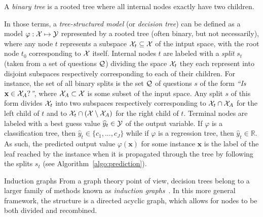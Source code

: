 \begin{definition}
A \emph{binary tree} is a rooted tree where all internal nodes exactly
have two children.
\end{definition}

In those terms, a \textit{tree-structured model} (or \textit{decision tree})
can be defined as a model $\varphi: {\cal X} \mapsto {\cal Y}$ represented by a
rooted tree (often binary, but not necessarily), where any node $t$ represents
a subspace ${\cal X}_t \subseteq {\cal X}$ of the intput space, with the root
node $t_0$ corresponding to ${\cal X}$ itself. Internal nodes $t$ are labeled with a
\textit{split} $s_t$ (taken from a set of questions ${\cal Q}$) dividing the
space ${\cal X}_t$ they each represent into disjoint subspaces respectively
corresponding to each of their children. For instance, the set of all binary
splits is the set ${\cal Q}$ of questions $s$ of the form \textit{``Is
$\mathbf{x} \in {\cal X}_A?$''}, where ${\cal X}_A \subset {\cal X}$ is some
subset of the input space. Any split $s$ of this form divides ${\cal X}_t$ into
two subspaces respectively corresponding to ${\cal X}_t \cap {\cal X}_A$ for
the left child of $t$ and to ${\cal X}_t \cap ({\cal X}\setminus{\cal X}_A)$
for the right child of $t$. Terminal nodes are labeled with a best guess value
$\widehat{y}_t \in {\cal Y}$ of the output variable. If $\varphi$ is a
classification tree, then $\widehat{y}_t \in \{ c_1, ..., c_J \}$ while if
$\varphi$ is a regression tree, then $\widehat{y}_t \in \mathbb{R}$. As such,
the predicted output value $\varphi(\mathbf{x})$ for some instance $\mathbf{x}$
is the label of the leaf reached by the instance when it is propagated through
the tree by following the splits $s_t$ (see Algorithm~\ref{algo:prediction}).


\begin{remark}{Induction graphs}
From a graph theory point of view, decision trees belong to a larger family
of methods known as \textit{induction graphs}~\citep{zighed:2000}. In this more
general framework, the structure is a directed acyclic graph, which allows for
nodes to be both divided and recombined.
\end{remark}

